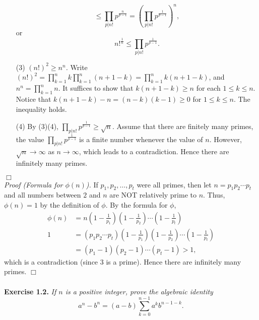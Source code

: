 \documentclass{article}
\begin{document}
\begin{enumerate}
$$\leq \prod_{p|n!} p^{\frac{n}{p - 1}}
= \left( \prod_{p|n!} p^{\frac{1}{p - 1}} \right)^n, $$
or
$$n!^{\frac{1}{n}} \leq \prod_{p|n!}p^{\frac{1}{p - 1}}.$$
\item[(3)]
\emph{$(n!)^2 \geq n^n$.}
Write
$(n!)^2 = \prod_{k=1}^n k \prod_{k=1}^n (n + 1 - k) = \prod_{k=1}^n k(n + 1 - k)$,
and $n^n = \prod_{k=1}^n n$.
It suffices to show that $k(n + 1 - k) \geq n$ for each $1 \leq k \leq n$.
Notice that $k(n + 1 - k) - n = (n - k)(k - 1) \geq 0$ for $1 \leq k \leq n$.
The inequality holds.
\item[(4)]
By (3)(4), $\prod_{p|n!}p^{\frac{1}{p - 1}} \geq \sqrt{n}$.
Assume that there are finitely many primes,
the value $\prod_{p|n!} p^{\frac{1}{p - 1}}$ is a finite number
whenever the value of $n$.
However, $\sqrt{n} \rightarrow \infty$ as $n \rightarrow \infty$,
which leads to a contradiction.
Hence there are infinitely many primes.
\end{enumerate}
$\Box$ \\

\emph{Proof (Formula for $\phi(n)$).}
If
$p_1, p_2, \ldots, p_t$ were all primes, then let
$n = p_1 p_2 \cdots p_t$ and all numbers between $2$ and $n$ are
NOT relatively prime to $n$.
Thus, $\phi(n) = 1$ by the definition of $\phi$.
By the formula for $\phi$,
\begin{align*}
\phi(n)
&= n
\left( 1 - \frac{1}{p_1} \right)
\left( 1 - \frac{1}{p_2} \right)
\cdots
\left( 1 - \frac{1}{p_t} \right) \\
1
&= (p_1 p_2 \cdots p_t)
\left( 1 - \frac{1}{p_1} \right)
\left( 1 - \frac{1}{p_2} \right)
\cdots
\left( 1 - \frac{1}{p_t} \right) \\
&= (p_1 - 1)(p_2 - 1) \cdots (p_t - 1) > 1,
\end{align*}
which is a contradiction (since $3$ is a prime).
Hence there are infinitely many primes.
$\Box$ \\\\






\textbf{Exercise 1.2.}
\emph{If $n$ is a positive integer, prove the algebraic identity
$$a^n - b^n = (a - b) \sum_{k=0}^{n-1} a^k b^{n-1-k}.$$} \\
\end{document}
